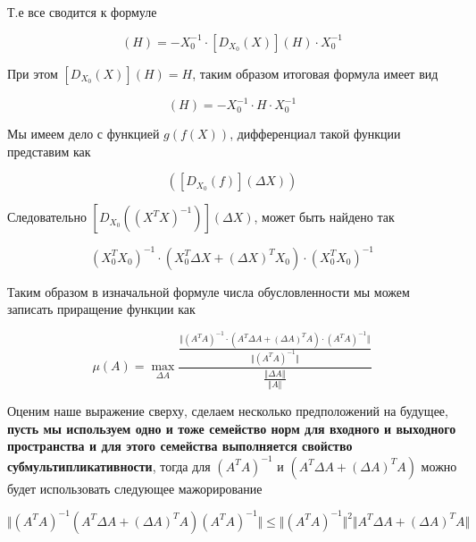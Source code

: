 \documentclass{article}
\begin{document}
    Т.е все сводится к формуле

    \begin{equation}
        [D_{X_{0}} (X^{-1})](H) = - X_{0}^{-1} \cdot [D_{X_{0}} (X)](H) \cdot X_{0}^{-1}
    \end{equation}

    При этом $[D_{X_{0}} (X)](H) = H$, таким образом итоговая формула имеет вид

    \begin{equation}
        [D_{X_{0}} (X^{-1})](H) = - X_{0}^{-1} \cdot H \cdot X_{0}^{-1}
    \end{equation}

    Мы имеем дело с функцией $g(f(X))$, дифференциал такой функции представим как

    \begin{equation}
        [D_{f(X_{0})} (g)]([D_{X_{0}} (f)] (\Delta X))
    \end{equation}

    Следовательно $[D_{X_{0}} ((X^{T} X)^{-1})](\Delta X)$, может быть найдено так

    \begin{equation}
       (X_{0}^{T} X_{0})^{-1} \cdot (X_{0}^{T} \Delta X + (\Delta X)^{T} X_{0}) \cdot (X_{0}^{T} X_{0})^{-1}
    \end{equation}

    Таким образом в изначальной формуле числа обусловленности мы можем записать приращение функции как

    \begin{equation}
        \mu(A) = \max_{\Delta A} \frac{ \frac{\Vert  (A^{T} A)^{-1} \cdot (A^{T} \Delta A + (\Delta A)^{T} A) \cdot (A^{T} A)^{-1} \Vert }{\Vert (A^T A)^{-1} \Vert} }{ \frac{\Vert \Delta A \Vert}{\Vert A \Vert} }
    \end{equation}

    Оценим наше выражение сверху, сделаем несколько предположений на будущее, \textbf{пусть мы используем одно и тоже семейство норм для входного и выходного пространства и для этого семейства выполняется свойство субмультипликативности},
    тогда для $(A^{T} A)^{-1}$ и $(A^{T} \Delta A + (\Delta A)^{T} A)$ можно будет использовать следующее мажорирование

    \begin{equation}
        \Vert  (A^{T} A)^{-1}  (A^{T} \Delta A + (\Delta A)^{T} A) (A^{T} A)^{-1} \Vert  \leq \Vert (A^{T} A)^{-1} \Vert^{2} \Vert A^{T} \Delta A + (\Delta A)^{T} A \Vert
    \end{equation}
\end{document}
